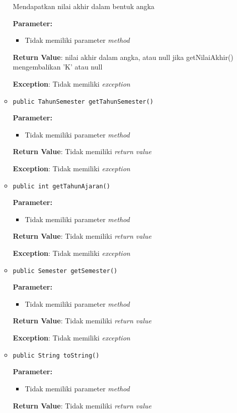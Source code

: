 \documentclass{article}
\begin{document}
\begin{enumerate}
\begin{itemize}
Mendapatkan nilai akhir dalam bentuk angka

\textbf{Parameter:}
\begin{itemize}
\item Tidak memiliki parameter \textit{method}
\end{itemize}
\textbf{Return Value}: nilai akhir dalam angka, atau null jika getNilaiAkhir() mengembalikan 'K' atau null

\textbf{Exception}: Tidak memiliki \textit{exception}

\item \texttt{public TahunSemester getTahunSemester()}



\textbf{Parameter:}
\begin{itemize}
\item Tidak memiliki parameter \textit{method}
\end{itemize}
\textbf{Return Value}: Tidak memiliki \textit{return value}

\textbf{Exception}: Tidak memiliki \textit{exception}

\item \texttt{public int getTahunAjaran()}



\textbf{Parameter:}
\begin{itemize}
\item Tidak memiliki parameter \textit{method}
\end{itemize}
\textbf{Return Value}: Tidak memiliki \textit{return value}

\textbf{Exception}: Tidak memiliki \textit{exception}

\item \texttt{public Semester getSemester()}



\textbf{Parameter:}
\begin{itemize}
\item Tidak memiliki parameter \textit{method}
\end{itemize}
\textbf{Return Value}: Tidak memiliki \textit{return value}

\textbf{Exception}: Tidak memiliki \textit{exception}

\item \texttt{public String toString()}



\textbf{Parameter:}
\begin{itemize}
\item Tidak memiliki parameter \textit{method}
\end{itemize}
\textbf{Return Value}: Tidak memiliki \textit{return value}


\end{itemize}
\end{enumerate}
\end{document}
